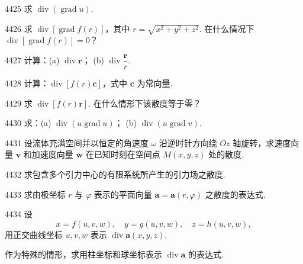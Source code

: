 \begin{prob}[S]{4425}
求 $\operatorname{div}(\operatorname{grad} u)$.
\end{prob}

\begin{prob}[M]{4426}
求 $\operatorname{div}[\operatorname{grad} f(r)]$，其中 $r = \sqrt{x^2 + y^2 + z^2}$. 在什么情况下 $\operatorname{div}[\operatorname{grad} f(r)] = 0$？
\end{prob}

\begin{prob}[M]{4427}
计算：(a) $\operatorname{div} \boldsymbol{r}$； \qquad (b) $\operatorname{div} \dfrac{\boldsymbol{r}}{r}$.
\end{prob}

\begin{prob}[S]{4428}
计算：$\operatorname{div}[f(r)\boldsymbol{c}]$，式中 $\boldsymbol{c}$ 为常向量.
\end{prob}

\begin{prob}[M]{4429}
求 $\operatorname{div}[f(r)\boldsymbol{r}]$. 在什么情形下该散度等于零？
\end{prob}

\begin{prob}[M]{4430}
求：(a) $\operatorname{div}(u \operatorname{grad} u)$； \qquad (b) $\operatorname{div}(u \operatorname{grad} v)$.
\end{prob}

\begin{prob}[M]{4431}
设流体充满空间并以恒定的角速度 $\omega$ 沿逆时针方向绕 $Oz$ 轴旋转，求速度向量 $\boldsymbol{v}$ 和加速度向量 $\boldsymbol{w}$ 在已知时刻在空间点 $M(x, y, z)$ 处的散度.
\end{prob}

\begin{prob}[M]{4432}
求包含多个引力中心的有限系统所产生的引力场之散度.
\end{prob}

\begin{prob}[M]{4433}
求由极坐标 $r$ 与 $\varphi$ 表示的平面向量 $\boldsymbol{a} = \boldsymbol{a}(r, \varphi)$ 之散度的表达式.
\end{prob}

\begin{prob}[L]{4434}
设
\[
x = f(u, v, w), \quad y = g(u, v, w), \quad z = h(u, v, w),
\]
用正交曲线坐标 $u, v, w$ 表示 $\operatorname{div} \boldsymbol{a}(x, y, z)$.

作为特殊的情形，求用柱坐标和球坐标表示 $\operatorname{div} \boldsymbol{a}$ 的表达式.
\end{prob}

